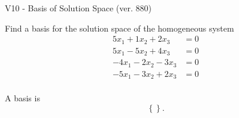 \begin{exercise}
  \begin{exerciseTitle}V10 - Basis of Solution Space (ver. 880)\end{exerciseTitle}
  \begin{exerciseStatement}
    Find a basis for the solution space of the homogeneous system 
\begin{align*}
 5 x_ 1 + 1 x_ 2 + 2 x_ 3 &= 0  \\ 
  5 x_ 1 -5 x_ 2 + 4 x_ 3 &= 0  \\ 
  -4 x_ 1 -2 x_ 2 -3 x_ 3 &= 0  \\ 
  -5 x_ 1 -3 x_ 2 + 2 x_ 3 &= 0  \\ 
 \end{align*}


 
  \end{exerciseStatement}

  \begin{exerciseAnswer}
   A basis is   
\[\left\{\right\}.\]

  


  \end{exerciseAnswer}
\end{exercise}